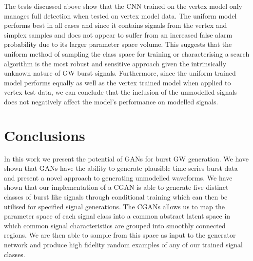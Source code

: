\documentclass[12pt]{iopart}
\begin{document}
%
The tests discussed above show that the \ac{CNN} trained on the vertex model only manages full detection when tested on vertex model data. The uniform model performs best in all cases and since it contains signals from the vertex and simplex samples and does not appear to suffer from an increased false alarm probability due to its larger parameter space volume. This suggests that the uniform method of sampling the class space for training or characterising a search algorithm is the most robust and sensitive approach given the intrinsically unknown nature of \ac{GW} burst signals. Furthermore, since the uniform trained model performs equally as well as the vertex trained model when applied to  vertex test data, we can conclude that the inclusion of the unmodelled signals does not negatively affect the model's performance on modelled signals.

\section{Conclusions}\label{conclusions}

%
%
In this work we present the potential of \acp{GAN} for
burst \ac{GW} generation. We have shown that \acp{GAN} have the ability to generate plausible time-series burst data and present a novel approach to generating unmodelled waveforms. We have shown that our implementation of a \ac{CGAN} is able to generate five distinct classes of burst like signals through conditional training which can then be utilised for specified signal generations. The \acp{CGAN} allows us to map the parameter space of each signal class into a common abstract latent space in which common signal characteristics are grouped into smoothly connected regions. We are then able to sample from this space as input to the generator network and produce high fidelity random examples of any of our trained signal classes.      
\end{document}
